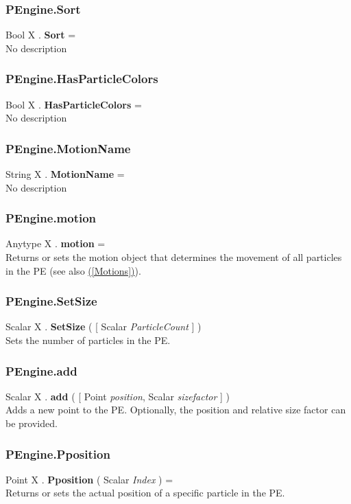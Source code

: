 \documentclass[10pt]{book}
\newcommand{\linkitem}[1]{\hyperref[#1]{\nameref{#1} (\ref{#1})}}
\begin{document}
\subsubsection{PEngine.Sort \label{F:PEngine:Sort}}
Bool X . \textbf{Sort} = \\
No description

\subsubsection{PEngine.HasParticleColors \label{F:PEngine:HasParticleColors}}
Bool X . \textbf{HasParticleColors} = \\
No description

\subsubsection{PEngine.MotionName \label{F:PEngine:MotionName}}
String X . \textbf{MotionName} = \\
No description

\subsubsection{PEngine.motion \label{F:PEngine:motion}}
Anytype X . \textbf{motion} = \\
Returns or sets the motion object that determines the movement of all particles in the PE
(see also \linkitem{Motions}).

\subsubsection{PEngine.SetSize \label{F:PEngine:SetSize}}
Scalar X . \textbf{SetSize} (  [ Scalar \textit{ParticleCount} ] ) \\
Sets the number of particles in the PE.

\subsubsection{PEngine.add \label{F:PEngine:add}}
Scalar X . \textbf{add} (  [ Point \textit{position}, Scalar \textit{sizefactor} ] ) \\
Adds a new point to the PE. Optionally, the position and relative size factor can be provided.

\subsubsection{PEngine.Pposition \label{F:PEngine:Pposition}}
Point X . \textbf{Pposition} ( Scalar \textit{Index} ) = \\
Returns or sets the actual position of a specific particle in the PE.
\end{document}
